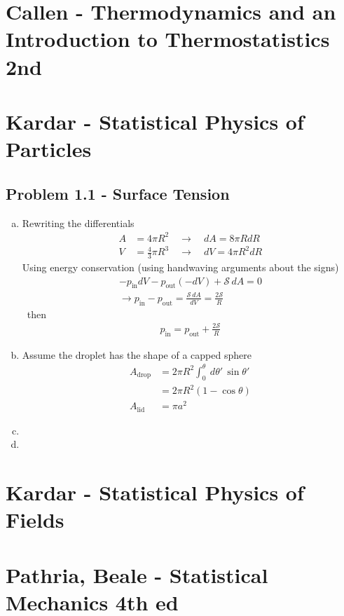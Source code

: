 \documentclass[10pt,a4paper]{book}
\theoremstyle{definition}
\begin{document}
\section{{\sc Callen} - Thermodynamics and an Introduction to Thermostatistics 2nd}

\section{{\sc Kardar} - Statistical Physics of Particles}
\subsection{Problem 1.1 - Surface Tension}
\begin{enumerate}[(a)]
\item Rewriting the differentials
\begin{align}
A&=4\pi R^2\quad\rightarrow\quad dA=8\pi R dR\\
V&=\frac{4}{3}\pi R^3\quad\rightarrow\quad dV=4\pi R^2 dR
\end{align}
Using energy conservation (using handwaving arguments about the signs)
\begin{align}
-p_\text{in}dV-p_\text{out}(-dV)+\mathcal{S}\,dA=0\\
\rightarrow p_\text{in}-p_\text{out}=\frac{\mathcal{S}\,dA}{dV}=\frac{2\mathcal{S}}{R}
\end{align}\
then
\begin{align}
p_\text{in}=p_\text{out}+\frac{2\mathcal{S}}{R}
\end{align}
\item Assume the droplet has the shape of a capped sphere
\begin{align}
A_\text{drop}
&=2\pi R^2\int_0^\theta\ d\theta'\,\sin\theta'\\
&=2\pi R^2(1-\cos\theta)\\
A_\text{lid}
&=\pi a^2
\end{align}




\item
\item
\end{enumerate}

\section{{\sc Kardar} - Statistical Physics of Fields}

\section{{\sc Pathria, Beale} - Statistical Mechanics 4th ed}
\end{document}

